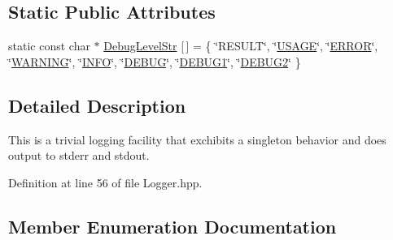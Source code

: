 \subsection*{Static Public Attributes}
\begin{DoxyCompactItemize}
\item 
static const char $\ast$ \hyperlink{class_logger_a30344984f1f6d2a5896a52a4788e8b72}{Debug\+Level\+Str} \mbox{[}$\,$\mbox{]} = \{ \char`\"{}R\+E\+S\+U\+L\+T\char`\"{}, \char`\"{}\hyperlink{class_logger_a96ecc57d01700c7b14d101f0f65a9932a83b5b4f40d4be307f9f26550c91cf3d5}{U\+S\+A\+G\+E}\char`\"{}, \char`\"{}\hyperlink{class_logger_a96ecc57d01700c7b14d101f0f65a9932a3ce1bbeb15a3d8e29e4c5e75492a781b}{E\+R\+R\+O\+R}\char`\"{}, \char`\"{}\hyperlink{class_logger_a96ecc57d01700c7b14d101f0f65a9932afb1bf96f41b282521d9438106ea11bca}{W\+A\+R\+N\+I\+N\+G}\char`\"{}, \char`\"{}\hyperlink{class_logger_a96ecc57d01700c7b14d101f0f65a9932a61a9b6fc1e9babc448984b8a34ca2ed2}{I\+N\+F\+O}\char`\"{}, \char`\"{}\hyperlink{class_logger_a96ecc57d01700c7b14d101f0f65a9932abdc8d840ac4b73e1bd3212184af8f85e}{D\+E\+B\+U\+G}\char`\"{}, \char`\"{}\hyperlink{class_logger_a96ecc57d01700c7b14d101f0f65a9932a5f7718483e39a028518b90f969b41771}{D\+E\+B\+U\+G1}\char`\"{}, \char`\"{}\hyperlink{class_logger_a96ecc57d01700c7b14d101f0f65a9932a616a45f059b15bff1cda9207cd465564}{D\+E\+B\+U\+G2}\char`\"{} \}
\end{DoxyCompactItemize}


\subsection{Detailed Description}
This is a trivial logging facility that exchibits a singleton behavior and does output to stderr and stdout. 

Definition at line 56 of file Logger.\+hpp.



\subsection{Member Enumeration Documentation}
\hypertarget{class_logger_a96ecc57d01700c7b14d101f0f65a9932}{}
